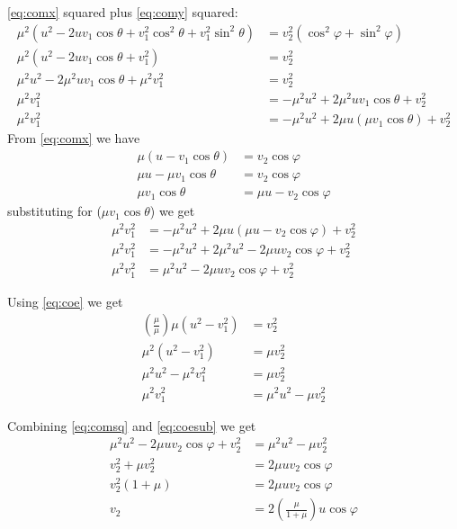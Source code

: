 \documentclass[twoside,english]{uiofysmaster/uiofysmaster}
\let\orgautoref\autoref
\renewcommand{\autoref}
        {\def\equationautorefname{Eq.}%
         \def\figureautorefname{Fig.}%
         \def\subfigureautorefname{Fig.}%
         \def\sectionautorefname{Sec.}%
         \def\subsectionautorefname{Sec.}%
         \def\subsubsectionautorefname{Sec.}%
         \def\Itemautorefname{item}%
         \def\tableautorefname{Tab.}%
         \orgautoref}
\begin{document}
\begin{appendices}
\autoref{eq:comx} squared plus \autoref{eq:comy} squared:
\begin{align*}%
	\mu^2 (u^2 - 2uv_1 \cos \theta + v_1^2 \cos^2 \theta + v_1^2 \sin^2 \theta) &= v_2^2 (\cos^2 \varphi + \sin^2 \varphi)  \\
	\mu^2 (u^2 - 2uv_1 \cos \theta + v_1^2) &= v_2^2  \\
	\mu^2 u^2 - 2\mu^2 uv_1 \cos \theta + \mu^2 v_1^2 &= v_2^2  \\
	\mu^2 v_1^2 &= -\mu^2 u^2 + 2\mu^2 uv_1 \cos \theta + v_2^2  \\
	\mu^2 v_1^2 &= -\mu^2 u^2 + 2\mu u (\mu v_1 \cos \theta) + v_2^2
\end{align*}
From \autoref{eq:comx} we have
\begin{align*}%
	\mu (u - v_1 \cos \theta) &= v_2 \cos \varphi  \\
	\mu u - \mu v_1 \cos \theta &= v_2 \cos \varphi  \\
	\mu v_1 \cos \theta &= \mu u - v_2 \cos \varphi
\end{align*}
substituting for ($\mu v_1 \cos \theta$) we get 
\begin{align}\label{eq:comsq}
	\mu^2 v_1^2 &= -\mu^2 u^2 + 2\mu u (\mu u - v_2 \cos \varphi ) + v_2^2  \nonumber\\
	\mu^2 v_1^2 &= -\mu^2 u^2 + 2\mu^2 u^2 - 2\mu u v_2 \cos \varphi + v_2^2  \nonumber\\
	\mu^2 v_1^2 &= \mu^2 u^2 - 2\mu u v_2 \cos \varphi + v_2^2
\end{align}

Using \autoref{eq:coe} we get
\begin{align}\label{eq:coesub}
    \left( \frac{\mu}{\mu} \right) \mu (u^2 - v_1^2) &= v_2^2  \nonumber\\
    \mu^2 (u^2 - v_1^2) &= \mu v_2^2  \nonumber\\
	\mu^2 u^2 - \mu^2 v_1^2 &= \mu v_2^2  \nonumber\\
	\mu^2 v_1^2 &= \mu^2 u^2 - \mu v_2^2
\end{align}

Combining \autoref{eq:comsq} and \autoref{eq:coesub} we get
\begin{align}\label{eq:comcoe}
    \mu^2 u^2 - 2\mu u v_2 \cos \varphi + v_2^2 &= \mu^2 u^2 - \mu v_2^2  \nonumber\\
    v_2^2 + \mu v_2^2 &= 2\mu u v_2 \cos \varphi  \nonumber\\
    v_2^2 (1 + \mu) &= 2\mu u v_2 \cos \varphi  \nonumber\\
    v_2 &= 2 \left( \frac{\mu}{1 + \mu} \right) u \cos \varphi 
\end{align}


\end{appendices}
\end{document}
